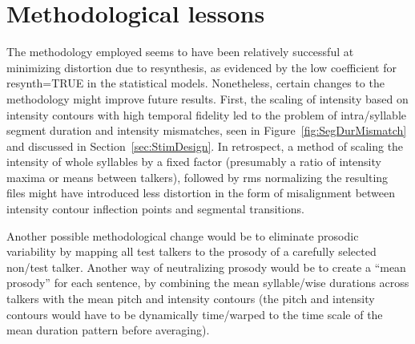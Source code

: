 \section{Methodological lessons}
The methodology employed seems to have been relatively successful at minimizing distortion due to resynthesis, as evidenced by the low coefficient for {\inlinecode resynth=TRUE} in the statistical models.  Nonetheless, certain changes to the methodology might improve future results.  First, the scaling of intensity based on intensity contours with high temporal fidelity led to the problem of intra\-/syllable segment duration and intensity mismatches, seen in Figure~\ref{fig:SegDurMismatch} and discussed in Section~\ref{sec:StimDesign}.  In retrospect, a method of scaling the intensity of whole syllables by a fixed factor (presumably a ratio of intensity maxima or means between talkers), followed by \ac{rms} normalizing the resulting files might have introduced less distortion in the form of misalignment between intensity contour inflection points and segmental transitions.

Another possible methodological change would be to eliminate prosodic variability by mapping all test talkers to the prosody of a carefully selected non\-/test talker.  Another way of neutralizing prosody would be to create a “mean prosody” for each sentence, by combining the mean syllable\-/wise durations across talkers with the mean pitch and intensity contours (the pitch and intensity contours would have to be dynamically time\-/warped to the time scale of the mean duration pattern before averaging).


